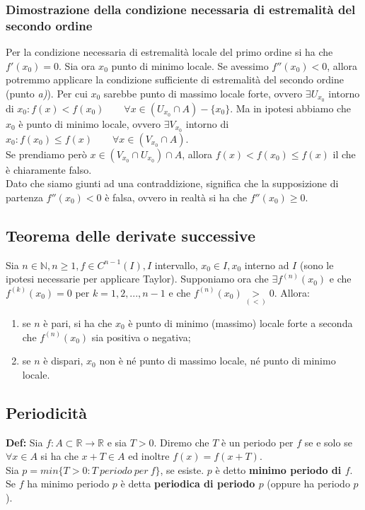 \documentclass{article}
\begin{document}
\subsubsection{Dimostrazione della condizione necessaria di estremalità del secondo ordine}
Per la condizione necessaria di estremalità locale del primo ordine si ha che $f'(x_0) = 0$. Sia ora $x_0$ punto di minimo locale. Se avessimo $f''(x_0) < 0$, allora potremmo applicare la condizione sufficiente di estremalità del secondo ordine (punto \textit{a)}). Per cui $x_0$ sarebbe punto di massimo locale forte, ovvero $\exists U_{x_0}$ intorno di $x_0 : f(x) < f(x_0) \qquad \forall x \in (U_{x_0} \cap A) - \{x_0\}$. Ma in ipotesi abbiamo che $x_0$ è punto di minimo locale, ovvero $\exists V_{x_0}$ intorno di $x_0 : f(x_0) \leq f(x) \qquad \forall x \in (V_{x_0} \cap A)$.\\
Se prendiamo però $x \in (V_{x_0} \cap U_{x_0}) \cap A$, allora $f(x) < f(x_0) \leq f(x)$ il che è chiaramente falso. \\
Dato che siamo giunti ad una contraddizione, significa che la supposizione di partenza $f''(x_0) < 0$ è falsa, ovvero in realtà si ha che $f''(x_0) \geq 0$.

\subsection{Teorema delle derivate successive}
Sia $n \in \mathbb{N}, n \geq 1, f \in C^{n - 1}(I), I$ intervallo, $x_0 \in I, x_0$ interno ad $I$ (sono le ipotesi necessarie per applicare Taylor). Supponiamo ora che $\exists f^{(n)}(x_0)$ e che $f^{(k)}(x_0) = 0$ per $k = 1, 2, ..., n - 1$ e che $f^{(n)}(x_0) \underset{(<)}{>} 0$. Allora:
\begin{enumerate}
    \item se $n$ è pari, si ha che $x_0$ è punto di minimo (massimo) locale forte a seconda che $f^{(n)}(x_0)$ sia positiva o negativa;
    \item se $n$ è dispari, $x_0$ non è né punto di massimo locale, né punto di minimo locale.
\end{enumerate}

\subsection{Periodicità}
\textbf{Def:} Sia $f: A \subset \mathbb{R} \xrightarrow{} \mathbb{R}$ e sia $T > 0$. Diremo che $T$ è un periodo per $f$ se e solo se $\forall x \in A$ si ha che $x + T \in A$ ed inoltre $f(x) = f(x + T)$.\\
Sia $p = min\{T > 0 : T \ periodo \ per \ f\}$, se esiste. $p$ è detto \textbf{minimo periodo di $f$}. Se $f$ ha minimo periodo $p$ è detta \textbf{periodica di periodo $p$} (oppure ha periodo $p$).\\
\end{document}
